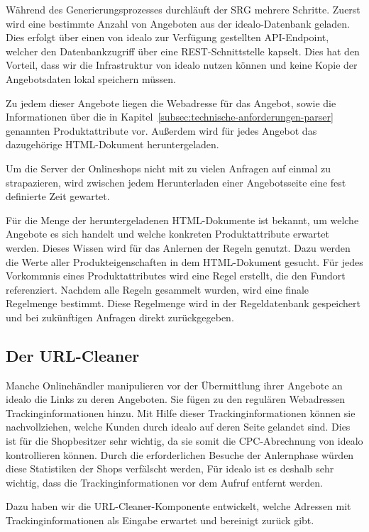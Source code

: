 Während des Generierungsprozesses durchläuft der SRG mehrere Schritte.
Zuerst wird eine bestimmte Anzahl von Angeboten aus der idealo-Datenbank geladen.
Dies erfolgt über einen von idealo zur Verfügung gestellten API-Endpoint, welcher den Datenbankzugriff über eine
REST-Schnittstelle kapselt.
Dies hat den Vorteil, dass wir die Infrastruktur von idealo nutzen können und keine Kopie der Angebotsdaten
lokal speichern müssen.

Zu jedem dieser Angebote liegen die Webadresse für das Angebot, sowie die  Informationen über die in
Kapitel~\ref{subsec:technische-anforderungen-parser} genannten Produktattribute vor.
Außerdem wird für jedes Angebot das dazugehörige HTML-Dokument heruntergeladen.

Um die Server der Onlineshops nicht mit zu vielen Anfragen auf einmal zu strapazieren, wird zwischen jedem
Herunterladen einer Angebotsseite eine fest definierte Zeit gewartet.

Für die Menge der heruntergeladenen HTML-Dokumente ist bekannt, um welche Angebote es sich handelt und welche
konkreten Produktattribute erwartet werden.
Dieses Wissen wird für das Anlernen der Regeln genutzt.
Dazu werden die Werte aller Produkteigenschaften in dem HTML-Dokument gesucht.
Für jedes Vorkommnis eines Produktattributes wird eine Regel erstellt, die den Fundort referenziert.
Nachdem alle Regeln gesammelt wurden, wird eine finale Regelmenge bestimmt.
Diese Regelmenge wird in der Regeldatenbank gespeichert und bei zukünftigen Anfragen direkt zurückgegeben.

\subsection{Der URL-Cleaner}
\label{subsec:urlcleaner}

Manche Onlinehändler manipulieren vor der Übermittlung ihrer Angebote an idealo die Links zu deren Angeboten.
Sie fügen zu den regulären Webadressen Trackinginformationen hinzu.
Mit Hilfe dieser Trackinginformationen können sie nachvollziehen, welche Kunden durch idealo auf deren Seite gelandet
sind.
Dies ist für die Shopbesitzer sehr wichtig, da sie somit die CPC-Abrechnung von idealo kontrollieren können.
Durch die erforderlichen Besuche der Anlernphase würden diese Statistiken der Shops verfälscht werden,
Für idealo ist es deshalb sehr wichtig, dass die Trackinginformationen vor dem Aufruf entfernt werden.

Dazu haben wir die URL-Cleaner-Komponente entwickelt, welche Adressen mit Trackinginformationen als Eingabe erwartet und
bereinigt zurück gibt.

